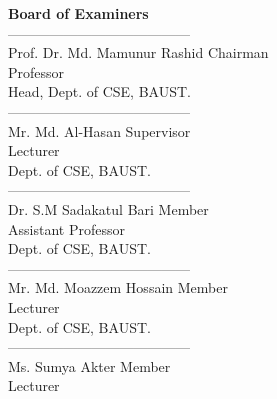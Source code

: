 \documentclass[12pt,a4paper]{report}
\begin{document}
\begin{titlepage}
	\thispagestyle{fancy}
	\RaggedRight{}
	{\center
	\vspace{.3in}
	{\fontsize{16}{10}\selectfont\textbf{Board of Examiners}}\\
	\vspace{.5in}}
	\RaggedRight ---------------------------------------\\
	Prof. Dr. Md. Mamunur Rashid\hspace{17em} Chairman\\
	Professor\\
	Head, Dept. of CSE, BAUST.
	\vspace{.5in}\\
	\RaggedRight ---------------------------------------\\
	Mr. Md. Al-Hasan\hspace{22em} Supervisor\\
	Lecturer\\
	Dept. of CSE, BAUST.
	\vspace{.5in}\\
	\RaggedRight ---------------------------------------\\
	Dr. S.M Sadakatul Bari\hspace{21em} Member\\
	Assistant Professor\\
	Dept. of CSE, BAUST.
	\vspace{.5in}\\
	\RaggedRight ---------------------------------------\\
	\RaggedRight Mr. Md. Moazzem Hossain\hspace{19em} Member\\
	Lecturer\\
	Dept. of CSE, BAUST.
	\vspace{.5in}\\
	\RaggedRight ---------------------------------------\\
	Ms. Sumya Akter\hspace{23em} Member\\
	Lecturer\\

\end{titlepage}
\end{document}
